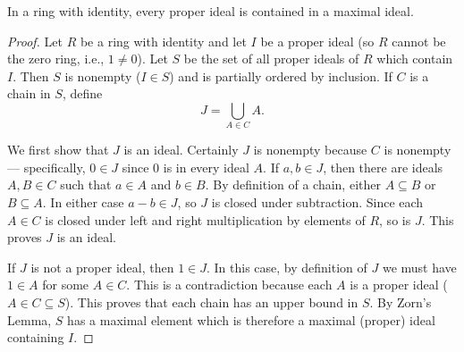 \documentclass[11pt,a4paper]{article}
\begin{document}
\begin{prop}
    In a ring with identity, every proper ideal is contained in a maximal ideal.
\end{prop}
\begin{proof}
Let \( R \) be a ring with identity and let \( I \) be a proper ideal (so \( R \) cannot be the zero ring, i.e., \( 1 \neq 0 \)). Let \( S \) be the set of all proper ideals of \( R \) which contain \( I \). Then \( S \) is nonempty (\( I \in S \)) and is partially ordered by inclusion. If \( C \) is a chain in \( S \), define
\[
J = \bigcup_{A \in C} A.
\]

We first show that \( J \) is an ideal. Certainly \( J \) is nonempty because \( C \) is nonempty — specifically, \( 0 \in J \) since \( 0 \) is in every ideal \( A \). If \( a, b \in J \), then there are ideals \( A, B \in C \) such that \( a \in A \) and \( b \in B \). By definition of a chain, either \( A \subseteq B \) or \( B \subseteq A \). In either case \( a - b \in J \), so \( J \) is closed under subtraction. Since each \( A \in C \) is closed under left and right multiplication by elements of \( R \), so is \( J \). This proves \( J \) is an ideal.

If \( J \) is not a proper ideal, then \( 1 \in J \). In this case, by definition of \( J \) we must have \( 1 \in A \) for some \( A \in C \). This is a contradiction because each \( A \) is a proper ideal (\( A \in C \subseteq S \)). This proves that each chain has an upper bound in \( S \). By Zorn's Lemma, \( S \) has a maximal element which is therefore a maximal (proper) ideal containing \( I \).

\end{proof}


\end{document}
